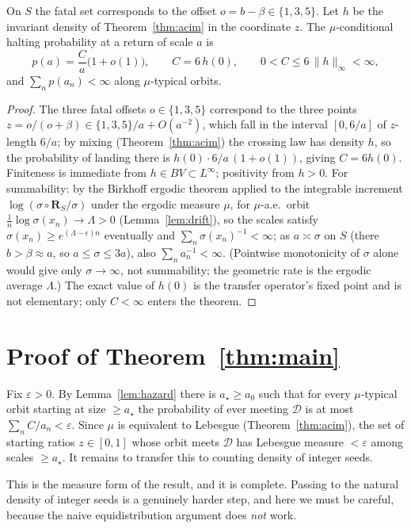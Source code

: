 \documentclass[11pt]{article}
\theoremstyle{definition}\newtheorem{definition}{Definition}
\theoremstyle{remark}\newtheorem{remark}{Remark}
\newcommand{\R}{\mathbf{R}}\newcommand{\Z}{\mathbb{Z}}\newcommand{\N}{\mathbb{N}}
\newcommand{\D}{\mathcal D}\newcommand{\Leb}{\mathrm{Leb}}
\begin{document}
\begin{lemma}\label{lem:hazard}
On $S$ the fatal set corresponds to the offset $o=b-\beta\in\{1,3,5\}$. Let
$h$ be the invariant density of Theorem~\ref{thm:acim} in the coordinate
$z$. The $\mu$-conditional halting probability at a return of scale $a$ is
\[
p(a)=\frac{C}{a}\bigl(1+o(1)\bigr),\qquad C=6\,h(0),\qquad 0<C\le 6\,\|h\|_{\infty}<\infty,
\]
and $\sum_n p(a_n)<\infty$ along $\mu$-typical orbits.
\end{lemma}
\begin{proof}
The three fatal offsets $o\in\{1,3,5\}$ correspond to the three points
$z=o/(o+\beta)\in\{1,3,5\}/a+O(a^{-2})$, which fall in the interval
$[0,6/a]$ of $z$-length $6/a$; by mixing (Theorem~\ref{thm:acim}) the
crossing law has density $h$, so the probability of landing there is
$h(0)\cdot 6/a\,(1+o(1))$, giving $C=6h(0)$. Finiteness is immediate from
$h\in BV\subset L^\infty$; positivity from $h>0$. For summability: by the
Birkhoff ergodic theorem applied to the integrable increment
$\log(\sigma\circ\R_S/\sigma)$ under the ergodic measure $\mu$, for
$\mu$-a.e.\ orbit $\tfrac1n\log\sigma(x_n)\to\Lambda>0$
(Lemma~\ref{lem:drift}), so the scales satisfy $\sigma(x_n)\ge
e^{(\Lambda-\epsilon)n}$ eventually and $\sum_n\sigma(x_n)^{-1}<\infty$; as
$a\asymp\sigma$ on $S$ (there $b>\beta\approx a$, so $a\le\sigma\le3a$), also
$\sum_n a_n^{-1}<\infty$. (Pointwise monotonicity of $\sigma$ alone would give
only $\sigma\to\infty$, not summability; the geometric rate is the ergodic
average $\Lambda$.) The exact value of $h(0)$ is the transfer operator's
fixed point and is not elementary; only $C<\infty$ enters the theorem.
\end{proof}

\section{Proof of Theorem~\ref{thm:main}}
Fix $\varepsilon>0$. By Lemma~\ref{lem:hazard} there is $a_\star\ge a_0$
such that for every $\mu$-typical orbit starting at size $\ge a_\star$ the
probability of ever meeting $\D$ is at most $\sum_{n}C/a_n<\varepsilon$.
Since $\mu$ is equivalent to Lebesgue (Theorem~\ref{thm:acim}), the set of
starting ratios $z\in[0,1]$ whose orbit meets $\D$ has Lebesgue measure
$<\varepsilon$ among scales $\ge a_\star$. It remains to transfer this to
counting density of integer seeds.

This is the measure form of the result, and it is complete. Passing to the
natural density of integer seeds is a genuinely harder step, and here we must
be careful, because the naive equidistribution argument does \emph{not} work.
\end{document}
